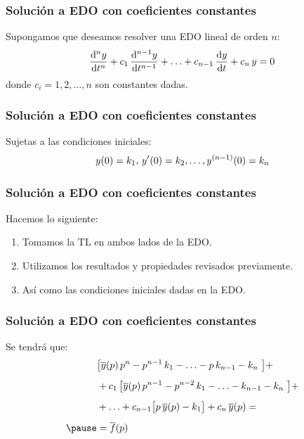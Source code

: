 \begin{frame}
\frametitle{Solución a EDO con coeficientes constantes}
Supongamos que deseamos resolver una EDO lineal de orden $n$:
\pause
\begin{align}
\dv[n]{y}{t} + c_{1} \, \dv[n-1]{y}{t} + \ldots + c_{n-1} \, \dv{y}{t} + c_{n} \, y = 0
\label{eq:ecuacion_04_54}
\end{align}
donde $c_{i} = 1, 2, \ldots, n$ son constantes dadas.
\end{frame}
\begin{frame}
\frametitle{Solución a EDO con coeficientes constantes}
Sujetas a las condiciones iniciales:
\pause
\begin{align*}
y(0) = k_{1}, \, {y}^{\prime}(0) = k_{2} , \ldots, {y}^{(n-1)}(0)= k_{n}
\end{align*}
\end{frame}
\begin{frame}
\frametitle{Solución a EDO con coeficientes constantes}
Hacemos lo siguiente:
\begin{enumerate}[<+->]
\item Tomamos la TL en ambos lados de la EDO.
\item Utilizamos los resultados y propiedades revisados previamente.
\item Así como las condiciones iniciales dadas en la EDO.
\end{enumerate}
\end{frame}
\begin{frame}
\frametitle{Solución a EDO con coeficientes constantes}
Se tendrá que:
\pause
\begin{eqnarray*}
\begin{aligned}
&\big[ \overline{y}(p) \, p^{n} - p^{n-1} \, k_{1} - \ldots - p \, k_{n-1} - k_{n}  \big] + \\[0.5em] 
&+ c_{1} \, \big[ \overline{y}(p) \, p^{n-1} - p^{n-2} \, k_{1} - \ldots - k_{n-1} - k_{n}  \big] + \\[0.5em] 
&+ \ldots + c_{n-1} \big[ p \, \overline{y}(p) - k_{1}  \big] + c_{n} \, \overline{y}(p) = \\[0.5em] \pause
&= \overline{f}(p)
\end{aligned}
\end{eqnarray*}
\end{frame}
